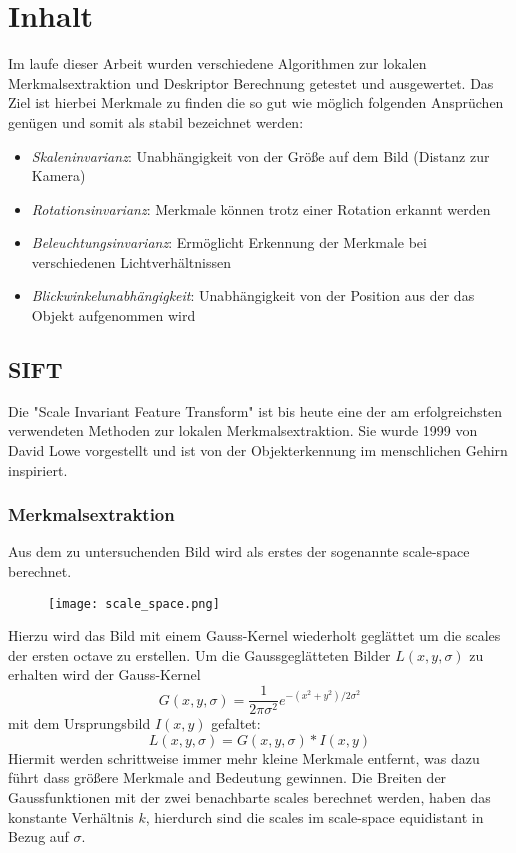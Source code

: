 \chapter{Inhalt}

Im laufe dieser Arbeit wurden verschiedene Algorithmen zur lokalen Merkmalsextraktion und Deskriptor Berechnung getestet und ausgewertet.
Das Ziel ist hierbei Merkmale zu finden die so gut wie möglich folgenden Ansprüchen genügen und somit als stabil bezeichnet werden:
\begin{itemize}
\item \emph{Skaleninvarianz}: Unabhängigkeit von der Größe auf dem Bild (Distanz zur Kamera)
\item \emph{Rotationsinvarianz}: Merkmale können trotz einer Rotation erkannt werden
\item \emph{Beleuchtungsinvarianz}: Ermöglicht Erkennung der Merkmale bei verschiedenen Lichtverhältnissen
\item \emph{Blickwinkelunabhängigkeit}: Unabhängigkeit von der Position aus der das Objekt aufgenommen wird
\end{itemize} 

\section{SIFT}

Die "Scale Invariant Feature Transform" ist bis heute eine der am erfolgreichsten verwendeten Methoden zur lokalen Merkmalsextraktion. Sie wurde 1999 von David Lowe vorgestellt und ist von der Objekterkennung im menschlichen Gehirn inspiriert.

\subsection{Merkmalsextraktion}

Aus dem zu untersuchenden Bild wird als erstes der sogenannte \Gls{scale-space} berechnet.

\begin{figure}[h]
\texttt{[image: scale\_space.png]}
\centering
\end{figure}
Hierzu wird das Bild mit einem Gauss-Kernel wiederholt geglättet um die \Glspl{scale} der ersten \Gls{octave} zu erstellen.
Um die Gaussgeglätteten Bilder $ L (x, y, \sigma ) $ zu erhalten wird der Gauss-Kernel 
\begin{equation}
G(x, y, \sigma) = \frac{1}{2\pi\sigma^{2}}e^{-(x^{2}+y^{2})/2\sigma^{2}}
\end{equation}
 mit dem Ursprungsbild $ I(x, y) $ gefaltet:
\begin{equation}
L(x, y, \sigma) = G(x, y, \sigma)\ast I(x, y)
\end{equation}
Hiermit werden schrittweise immer mehr kleine Merkmale entfernt, was dazu führt dass größere Merkmale and Bedeutung gewinnen.
Die Breiten der Gaussfunktionen mit der zwei benachbarte \Glspl{scale} berechnet werden, haben das konstante Verhältnis $ k $, hierdurch sind die \Glspl{scale} im \Gls{scale-space} equidistant in Bezug auf $ \sigma $.

